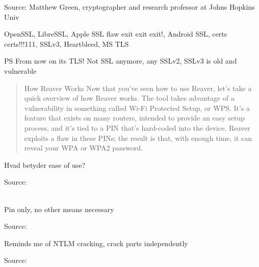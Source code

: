 \documentclass[20pt,landscape,a4paper]{foils}
\begin{document}
Source: Matthew Green, cryptographer and research professor at Johns Hopkins Univ\\
{\tiny{}
 
}


OpenSSL, LibreSSL, Apple SSL flaw exit exit exit!, Android SSL, certs certs!!!111, SSLv3, Heartbleed, MS TLS




\vskip 1cm
PS From now on its TLS! Not SSL anymore, any SSLv2, SSLv3 is old and vulnerable


\begin{quote}
How Reaver Works
Now that you've seen how to use Reaver, let's take a quick overview of how Reaver works. The tool takes advantage of a vulnerability in something called Wi-Fi Protected Setup, or WPS. It's a feature that exists on many routers, intended to provide an easy setup process, and it's tied to a PIN that's hard-coded into the device. Reaver exploits a flaw in these PINs; the result is that, with enough time, it can reveal your WPA or WPA2 password.
\end{quote}

\centerline{Hvad betyder ease of use?}

Source: \\
\\
{\footnotesize {}}



\centerline{Pin only, no other means necessary}

Source:\\





\centerline{Reminds me of NTLM cracking, crack parts independently}

Source:\\
\end{document}
